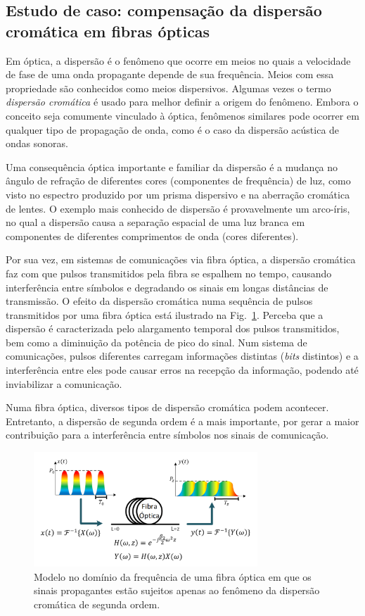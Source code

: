 \documentclass[12pt,addpoints]{exam}
\begin{document}
\subsection{Estudo de caso: compensação da dispersão cromática em fibras ópticas}
Em óptica, a dispersão é o fenômeno que ocorre em meios no quais a velocidade de fase de uma onda propagante depende de sua frequência. Meios com essa propriedade são conhecidos como meios dispersivos. Algumas vezes o termo \textit{dispersão cromática} é usado para melhor definir a origem do fenômeno. Embora o conceito seja comumente vinculado à óptica, fenômenos similares pode ocorrer em qualquer tipo de propagação de onda, como é o caso da dispersão acústica de ondas sonoras.
 
Uma consequência óptica importante e familiar da dispersão é a mudança no ângulo de refração de diferentes cores (componentes de frequência) de luz, como visto no espectro produzido por um prisma dispersivo e na aberração cromática de lentes. O exemplo mais conhecido de dispersão é provavelmente um arco-íris, no qual a dispersão causa a separação espacial de uma luz branca em componentes de diferentes comprimentos de onda (cores diferentes). 

Por sua vez, em sistemas de comunicações via fibra óptica, a dispersão cromática faz com que pulsos transmitidos pela fibra se espalhem no tempo, causando interferência entre símbolos e degradando os sinais em longas distâncias de transmissão. O efeito da dispersão cromática numa sequência de pulsos transmitidos por uma fibra óptica está ilustrado na Fig.~\ref{fig:GRC_5-0}. Perceba que a dispersão é caracterizada pelo alargamento temporal dos pulsos transmitidos, bem como a diminuição da potência de pico do sinal. Num sistema de comunicações, pulsos diferentes carregam informações  distintas (\textit{bits} distintos) e a interferência entre eles pode causar erros na recepção da informação, podendo até inviabilizar a comunicação.

Numa fibra óptica, diversos tipos de dispersão cromática podem acontecer. Entretanto, a dispersão de segunda ordem é a mais importante, por gerar a maior contribuição para a interferência entre símbolos nos sinais de comunicação. 

\begin{figure}[h]
        \centering
        \includegraphics[width=0.75\textwidth]{Figuras/Labo5-0}
        \caption{Modelo no domínio da frequência de uma fibra óptica em que os sinais propagantes estão sujeitos apenas ao fenômeno da dispersão cromática de segunda ordem.}
        \label{fig:GRC_5-0}
\end{figure}
\end{document}
